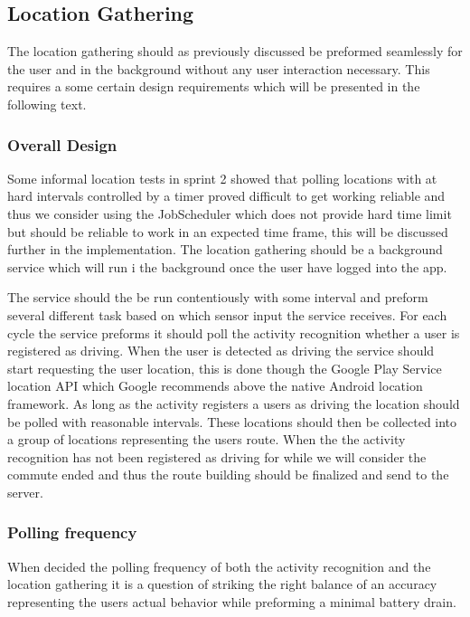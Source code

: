 \subsection{Location Gathering}
The location gathering should as previously discussed be preformed seamlessly for the user and in the background without any user interaction necessary. 
This requires a some certain design requirements which will be presented in the following text. 

\subsubsection{Overall Design}
Some informal location tests in sprint 2 showed that polling locations with at hard intervals controlled by a timer proved difficult to get working reliable and thus we consider using the JobScheduler which does not provide hard time limit but should be reliable to work in an expected time frame, this will be discussed further in the implementation.
The location gathering should be a background service which will run i the background once the user have logged into the app. 

The service should the be run contentiously with some interval and preform several different task based on which sensor input the service receives. 
For each cycle the service preforms it should poll the activity recognition whether a user is registered as driving. 
When the user is detected as driving the service should start requesting the user location, this is done though the Google Play Service location API which Google recommends above the native Android location framework\cite{apploc}.
As long as the activity registers a users as driving the location should be polled with reasonable intervals.
These locations should then be collected into a group of locations representing the users route.
When the the activity recognition has not been registered as driving for  while we will consider the commute ended and thus the route building should be finalized and send to the server.  

\subsubsection{Polling frequency}
When decided the polling frequency of both the activity recognition and the location gathering it is a question of striking the right balance of an accuracy representing the users actual behavior while preforming a minimal battery drain.

